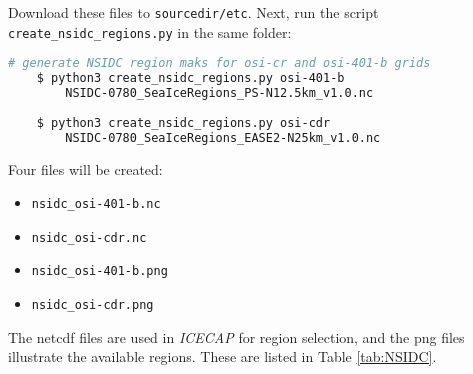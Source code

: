 \documentclass[DIV=10, parskip=full]{scrreprt}
\newcommand{\ice}{\textit{ICECAP}\xspace}
\begin{document}
Download these files to \texttt{sourcedir/etc}. Next, run the script \texttt{create\_nsidc\_regions.py} in the same folder:

  \begin{lstlisting}[language=bash]
	# generate NSIDC region maks for osi-cr and osi-401-b grids
	$ python3 create_nsidc_regions.py osi-401-b 
		NSIDC-0780_SeaIceRegions_PS-N12.5km_v1.0.nc
	
	$ python3 create_nsidc_regions.py osi-cdr 
		NSIDC-0780_SeaIceRegions_EASE2-N25km_v1.0.nc
\end{lstlisting}

Four files will be created:
\begin{itemize}
	\item \texttt{nsidc\_osi-401-b.nc}
	\item \texttt{nsidc\_osi-cdr.nc}
	\item \texttt{nsidc\_osi-401-b.png}
	\item \texttt{nsidc\_osi-cdr.png}
\end{itemize}

The netcdf files are used in \ice for region selection, and the png files illustrate the available regions. These are listed in Table \ref{tab:NSIDC}.  \\
\end{document}

